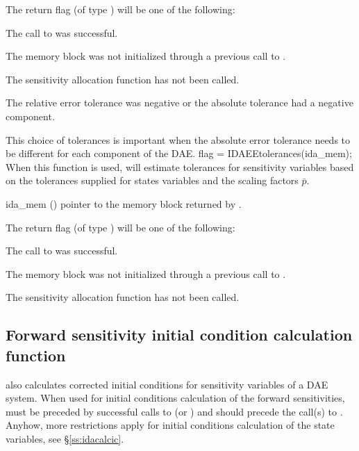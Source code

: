 {
  The return flag  (of type ) will be one of the following:
  \begin{args}
  \item[\Id{IDA\_SUCCESS}]
    The call to  was successful.
  \item[\Id{IDA\_MEM\_NULL}] 
    The {\idas} memory block was not initialized through a previous call to
    .
  \item[\Id{IDA\_NO\_SENS}] 
    The sensitivity allocation function  has not been called.
  \item[\Id{IDA\_ILL\_INPUT}] 
    The relative error tolerance was negative or the absolute tolerance
    had a negative component.
  \end{args}
}
{
  This choice of tolerances is important when the absolute error tolerance needs to
  be different for each component of the DAE. 
}
{
  flag = IDAEEtolerances(ida\_mem);
}
{
  When this function is used, {\idas} will estimate tolerances for sensitivity variables based on the 
  tolerances supplied for states variables and the scaling factors $\bar p$.
}
{
  \begin{args}
  \item[ida\_mem] ()
    pointer to the {\idas} memory block returned by .
  \end{args}
}
{
  The return flag  (of type ) will be one of the following:
  \begin{args}
  \item[\Id{IDA\_SUCCESS}]
    The call to  was successful.
  \item[\Id{IDA\_MEM\_NULL}] 
    The {\idas} memory block was not initialized through a previous call to
    .
  \item[\Id{IDA\_NO\_SENS}] 
    The sensitivity allocation function  has not been called.
  \end{args}
}
{}


\subsection{Forward sensitivity initial condition calculation function}
\label{sss:idasenscalcic}

 also calculates corrected initial conditions for sensitivity
variables of a DAE system. When used for initial conditions calculation of the 
forward sensitivities,  must be preceded by successful calls to  
 (or ) and should precede the call(s) to 
. Anyhow, more restrictions apply for initial conditions
calculation of the state variables, see \S\ref{ss:idacalcic}.

